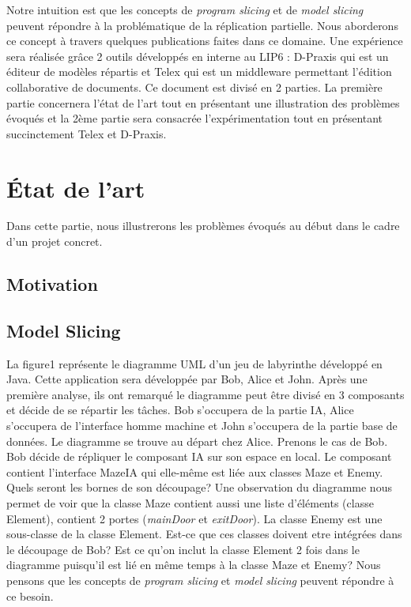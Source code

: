 \documentclass[a4paper,14pt]{article}
\begin{document}
Notre intuition est que les concepts de \textit{program slicing} et de \textit{model slicing} peuvent répondre à la problématique de la réplication partielle. Nous aborderons ce concept à travers quelques publications faites dans ce domaine. %
Une expérience sera réalisée grâce  2 outils développés en interne au LIP6 : D-Praxis qui est un éditeur de modèles répartis et Telex qui est un middleware permettant l'édition collaborative de documents.
Ce document est divisé en 2 parties. La première partie concernera l'état de l'art tout en présentant une illustration des problèmes évoqués et la 2ème partie sera consacrée  l'expérimentation tout en présentant succinctement Telex et D-Praxis. 


\section{État de l'art}
Dans cette partie, nous illustrerons les problèmes évoqués au début dans le cadre d'un projet concret. 
\subsection{Motivation}


\subsection{Model Slicing}
La figure1 représente le diagramme UML d'un jeu de labyrinthe développé en Java. Cette application sera développée par Bob, Alice et John. Après une première analyse, ils ont remarqué le diagramme peut être divisé en 3 composants et décide de se répartir les tâches. Bob s'occupera de la partie IA, Alice s'occupera de l'interface homme machine et John s'occupera de la partie base de données. Le diagramme se trouve au départ chez Alice. 
\newline Prenons le cas de Bob. Bob décide de répliquer le composant IA sur son espace en local. Le composant contient l'interface MazeIA qui elle-même est liée aux classes Maze et Enemy. Quels seront les bornes de son découpage? Une observation du diagramme nous permet de voir que la classe Maze contient aussi une liste d'éléments (classe Element), contient 2 portes (\textit{mainDoor} et \textit{exitDoor}). La classe Enemy est une sous-classe de la classe Element. Est-ce que ces classes doivent etre intégrées dans le découpage de Bob? Est ce qu'on inclut la classe Element 2 fois dans le diagramme puisqu'il est lié en même temps à la classe Maze et Enemy? Nous pensons que les concepts de \textit{program slicing} et \textit{model slicing} peuvent répondre à ce besoin.
\newline   
\end{document}
